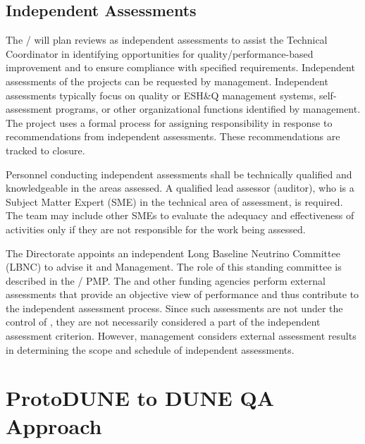 \subsection{Independent Assessments}

The /  will plan reviews as
independent assessments to assist the  Technical
Coordinator in identifying opportunities for quality/performance-based
improvement and to ensure compliance with specified
requirements. Independent assessments of the  projects can
be requested by  management. Independent assessments
typically focus on quality or ESH\&Q management systems, self-
assessment programs, or other organizational functions identified by
management. The  project uses a formal process for
assigning responsibility in response to recommendations from
independent assessments. These recommendations are tracked to closure.

Personnel conducting independent assessments shall be technically
qualified and knowledgeable in the areas assessed. A qualified lead
assessor (auditor), who is a Subject Matter Expert (SME) in the
technical area of assessment, is required. The team may include other
SMEs to evaluate the adequacy and effectiveness of activities only if
they are not responsible for the work being assessed.

The \fnal Directorate appoints an independent Long Baseline Neutrino
Committee (LBNC) to advise it and  Management. The role of
this standing committee is described in the /
PMP. The  and other funding agencies perform external
assessments that provide an objective view of performance and thus
contribute to the independent assessment process. Since such
assessments are not under the control of , they are not
necessarily considered a part of the independent assessment
criterion. However,  management considers external
assessment results in determining the scope and schedule of
independent assessments.

\section{ProtoDUNE to DUNE QA Approach}

